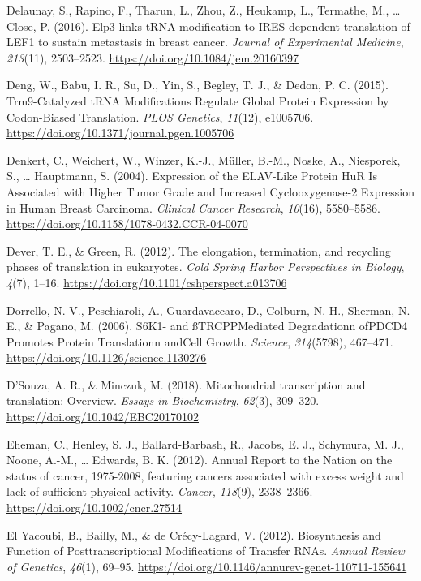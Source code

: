 \documentclass[12pt,openany]{book}
\begin{document}
\hypertarget{ref-Delaunay2016}{}
Delaunay, S., Rapino, F., Tharun, L., Zhou, Z., Heukamp, L., Termathe,
M., \ldots{} Close, P. (2016). Elp3 links tRNA modification to
IRES-dependent translation of LEF1 to sustain metastasis in breast
cancer. \emph{Journal of Experimental Medicine}, \emph{213}(11),
2503--2523. \url{https://doi.org/10.1084/jem.20160397}

\hypertarget{ref-Deng2015}{}
Deng, W., Babu, I. R., Su, D., Yin, S., Begley, T. J., \& Dedon, P. C.
(2015). Trm9-Catalyzed tRNA Modifications Regulate Global Protein
Expression by Codon-Biased Translation. \emph{PLOS Genetics},
\emph{11}(12), e1005706.
\url{https://doi.org/10.1371/journal.pgen.1005706}

\hypertarget{ref-Denkert2004}{}
Denkert, C., Weichert, W., Winzer, K.-J., Müller, B.-M., Noske, A.,
Niesporek, S., \ldots{} Hauptmann, S. (2004). Expression of the
ELAV-Like Protein HuR Is Associated with Higher Tumor Grade and
Increased Cyclooxygenase-2 Expression in Human Breast Carcinoma.
\emph{Clinical Cancer Research}, \emph{10}(16), 5580--5586.
\url{https://doi.org/10.1158/1078-0432.CCR-04-0070}

\hypertarget{ref-Dever2012}{}
Dever, T. E., \& Green, R. (2012). The elongation, termination, and
recycling phases of translation in eukaryotes. \emph{Cold Spring Harbor
Perspectives in Biology}, \emph{4}(7), 1--16.
\url{https://doi.org/10.1101/cshperspect.a013706}

\hypertarget{ref-Dorrello2006}{}
Dorrello, N. V., Peschiaroli, A., Guardavaccaro, D., Colburn, N. H.,
Sherman, N. E., \& Pagano, M. (2006). S6K1- and ßTRCPPMediated
Degradationn ofPDCD4 Promotes Protein Translationn andCell Growth.
\emph{Science}, \emph{314}(5798), 467--471.
\url{https://doi.org/10.1126/science.1130276}

\hypertarget{ref-DSouza2018}{}
D'Souza, A. R., \& Minczuk, M. (2018). Mitochondrial transcription and
translation: Overview. \emph{Essays in Biochemistry}, \emph{62}(3),
309--320. \url{https://doi.org/10.1042/EBC20170102}

\hypertarget{ref-Eheman2012}{}
Eheman, C., Henley, S. J., Ballard-Barbash, R., Jacobs, E. J., Schymura,
M. J., Noone, A.-M., \ldots{} Edwards, B. K. (2012). Annual Report to
the Nation on the status of cancer, 1975-2008, featuring cancers
associated with excess weight and lack of sufficient physical activity.
\emph{Cancer}, \emph{118}(9), 2338--2366.
\url{https://doi.org/10.1002/cncr.27514}

\hypertarget{ref-ElYacoubi2012}{}
El Yacoubi, B., Bailly, M., \& de Crécy-Lagard, V. (2012). Biosynthesis
and Function of Posttranscriptional Modifications of Transfer RNAs.
\emph{Annual Review of Genetics}, \emph{46}(1), 69--95.
\url{https://doi.org/10.1146/annurev-genet-110711-155641}
\end{document}
